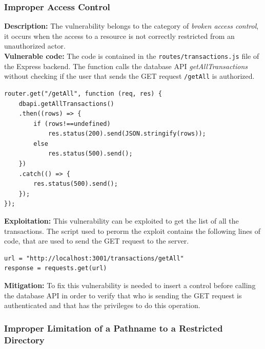 \documentclass[]{article}
\begin{document}
\subsubsection{Improper Access Control}
\label{subsubsec:improper_access_control}

\textbf{Description:} The vulnerability belongs to the category of {\it broken access control}, it occurs when the access to a resource is not correctly restricted from an unauthorized actor. 
\\ 
\textbf{Vulnerable code:} The code is contained in the \texttt{routes/transactions.js} file of the Express backend. The function calls the database
API {\it getAllTransactions} without checking if the user that sends the GET request \texttt{/getAll} is authorized.

\begin{lstlisting}
router.get("/getAll", function (req, res) { 
    dbapi.getAllTransactions()
    .then((rows) => {
        if (rows!==undefined)
            res.status(200).send(JSON.stringify(rows));
        else
            res.status(500).send();
    })
    .catch(() => {
        res.status(500).send();
    }); 
});
\end{lstlisting}
\textbf{Exploitation:} This vulnerability can be exploited to get the list of all the transactions. The script used to perorm the exploit contains the
following lines of code, that are used to send the GET request to the server.

\begin{lstlisting}
url = "http://localhost:3001/transactions/getAll"
response = requests.get(url)
\end{lstlisting}
\textbf{Mitigation:} To fix this vulnerability is needed to insert a control before calling the database API in order to verify that who is sending the 
GET request is authenticated and that has the privileges to do this operation.

\subsubsection{Improper Limitation of a Pathname to a Restricted Directory}
\label{subsubsec:improper_limitation_of_a_pathname_to_a_restricted_directory}
\end{document}
